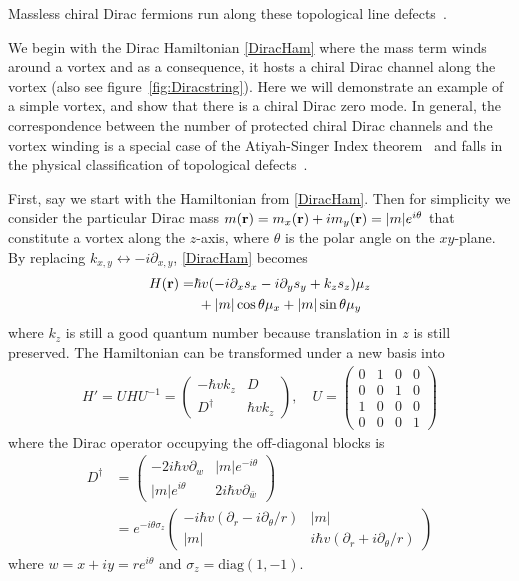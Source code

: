 Massless chiral Dirac fermions run along these topological line defects~\cite{TeoKane}.

We begin with the Dirac Hamiltonian \eqref{DiracHam} where the mass term winds around a vortex and as a consequence, it hosts a chiral Dirac channel along the vortex (also see figure~\ref{fig:Diracstring}). Here we will demonstrate an example of a simple vortex, and show that there is a chiral Dirac zero mode. In general, the correspondence between the number of protected chiral Dirac channels and the vortex winding is a special case of the Atiyah-Singer Index theorem~\cite{AtiyahSinger63} and falls in the physical classification of topological defects~\cite{TeoKane}.

First, say we start with the Hamiltonian from \eqref{DiracHam}. Then for simplicity we consider the particular Dirac mass $m({\bf r})=m_x({\bf r})+im_y({\bf r})=|m|e^{i\theta}$ that constitute a vortex along the $z$-axis, where $\theta$ is the polar angle on the $xy$-plane. By replacing $k_{x,y}\leftrightarrow-i\partial_{x,y}$, \eqref{DiracHam} becomes \begin{align}H({\bf r})=&\hbar v(-i\partial_xs_x-i\partial_ys_y+k_zs_z)\mu_z\nonumber\\&\;+|m|\cos\theta\mu_x+|m|\sin\theta\mu_y\label{DiracHamapp}\end{align} where $k_z$ is still a good quantum number because translation in $z$ is still preserved. The Hamiltonian can be transformed under a new basis into \begin{align}H'=UHU^{-1}=\left(\begin{smallmatrix}-\hbar vk_z&D\\D^\dagger&\hbar vk_z\end{smallmatrix}\right),\quad U =\left(\begin{smallmatrix}0&1&0&0\\0&0&1&0\\1&0&0&0\\0&0&0&1\end{smallmatrix}\right)\end{align} where the Dirac operator occupying the off-diagonal blocks is \begin{align}D^\dagger &=\left(\begin{smallmatrix}-2i\hbar v\partial_w&|m|e^{-i\theta}\\|m|e^{i\theta}&2i\hbar v \partial_{\bar{w}}\end{smallmatrix}\right)\nonumber\\&=e^{-i\theta\sigma_z}\left(\begin{smallmatrix}-i\hbar v(\partial_r-i \partial_\theta/r)&|m|\\|m|&i\hbar v(\partial_r+i\partial_\theta/r)\end{smallmatrix}\right)\end{align} where $w=x+iy=re^{i\theta}$ and $\sigma_z=\mathrm{diag}(1,-1)$. 

